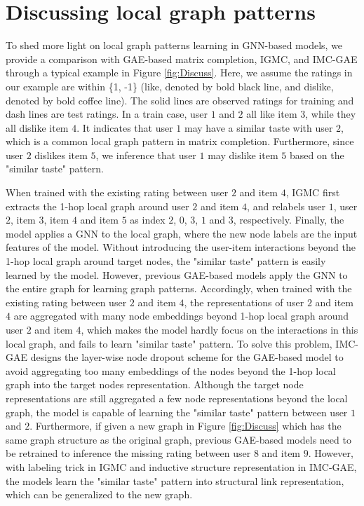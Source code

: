 \documentclass[sigconf]{acmart}
\begin{document}
\section{Discussing local graph patterns}
To shed more light on local graph patterns learning in GNN-based models, we provide a comparison with GAE-based matrix completion, IGMC, and IMC-GAE through a typical example in Figure \ref{fig:Discuss}. Here, we assume the ratings in our example are within \{1, -1\} (like, denoted by  bold black line, and dislike, denoted by bold coffee line). The solid lines are observed ratings for training and dash lines are test ratings. In a train case, user $1$ and $2$ all like item $3$, while they all dislike item $4$. It indicates that user $1$ may have a similar taste with user $2$, which is a common local graph pattern in matrix completion. Furthermore, since user $2$ dislikes item $5$, we inference that user $1$ may dislike item $5$ based on the "similar taste" pattern.

When trained with the existing rating between user $2$ and item $4$, IGMC first extracts the 1-hop local graph around user $2$ and item $4$, and relabels user $1$, user $2$, item $3$, item $4$ and item $5$ as index $2$, $0$, $3$, $1$ and $3$, respectively. Finally, the model applies a GNN to the local graph, where the new node labels are the input features of the model. Without introducing the user-item interactions beyond the 1-hop local graph around target nodes, the "similar taste" pattern is easily learned by the model. However, previous GAE-based models apply the GNN to the entire graph for learning graph patterns. Accordingly, when trained with the existing rating between user $2$ and item $4$, the representations of user $2$ and item $4$ are aggregated with many node embeddings beyond 1-hop local graph around user $2$ and item $4$, which makes the model hardly focus on the interactions in this local graph, and fails to learn "similar taste" pattern. To solve this problem, IMC-GAE designs the layer-wise node dropout scheme for the GAE-based model to avoid aggregating too many embeddings of the nodes beyond the 1-hop local graph into the target nodes representation. Although the target node representations are still aggregated a few node representations beyond the local graph, the model is capable of learning the "similar taste" pattern between user $1$ and $2$. Furthermore, if given a new graph in Figure \ref{fig:Discuss} which has the same graph structure as the original graph, previous GAE-based models need to be retrained to inference the missing rating between user $8$ and item $9$. However, 
with labeling trick in IGMC and inductive structure representation in IMC-GAE, the models learn the "similar taste" pattern into structural link representation, which can be generalized to the new graph.
\end{document}
